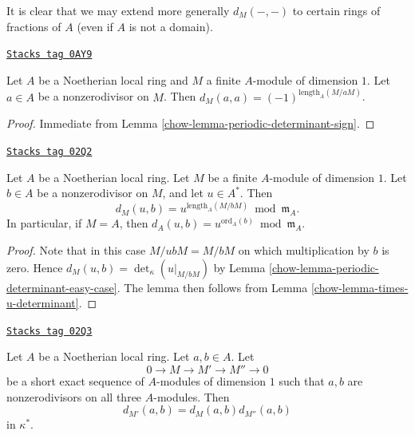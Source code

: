It is clear that we may extend more generally $d_M(-, -)$ to
certain rings of fractions of $A$ (even if $A$ is not a domain).

\begin{lemma}
\label{chow-lemma-symbol-when-equal}
\href{https://stacks.math.columbia.edu/tag/0AY9}{\texttt{Stacks tag 0AY9}}

Let $A$ be a Noetherian local ring and $M$ a finite $A$-module of
dimension $1$. Let $a \in A$ be a nonzerodivisor on $M$.
Then $d_M(a, a) = (-1)^{\text{length}_A(M/aM)}$.
\end{lemma}

\begin{proof}

Immediate from Lemma \ref{chow-lemma-periodic-determinant-sign}.
\end{proof}

\begin{lemma}
\label{chow-lemma-symbol-when-one-is-a-unit}
\href{https://stacks.math.columbia.edu/tag/02Q2}{\texttt{Stacks tag 02Q2}}

Let $A$ be a Noetherian local ring.
Let $M$ be a finite $A$-module of dimension $1$.
Let $b \in A$ be a nonzerodivisor on $M$, and let $u \in A^*$.
Then
$$
d_M(u, b) = u^{\text{length}_A(M/bM)} \bmod \mathfrak m_A.
$$
In particular, if $M = A$, then
$d_A(u, b) = u^{\text{ord}_A(b)} \bmod \mathfrak m_A$.
\end{lemma}

\begin{proof}

Note that in this case $M/ubM = M/bM$ on which multiplication
by $b$ is zero. Hence $d_M(u, b) = \det_\kappa(u|_{M/bM})$
by Lemma \ref{chow-lemma-periodic-determinant-easy-case}. The lemma
then follows from Lemma \ref{chow-lemma-times-u-determinant}.
\end{proof}

\begin{lemma}
\label{chow-lemma-symbol-short-exact-sequence}
\href{https://stacks.math.columbia.edu/tag/02Q3}{\texttt{Stacks tag 02Q3}}

Let $A$ be a Noetherian local ring.
Let $a, b \in A$.
Let
$$
0 \to M \to M' \to M'' \to 0
$$
be a short exact sequence of $A$-modules of dimension $1$
such that $a, b$ are nonzerodivisors on
all three $A$-modules.
Then
$$
d_{M'}(a, b) = d_M(a, b) d_{M''}(a, b)
$$
in $\kappa^*$.
\end{lemma}

